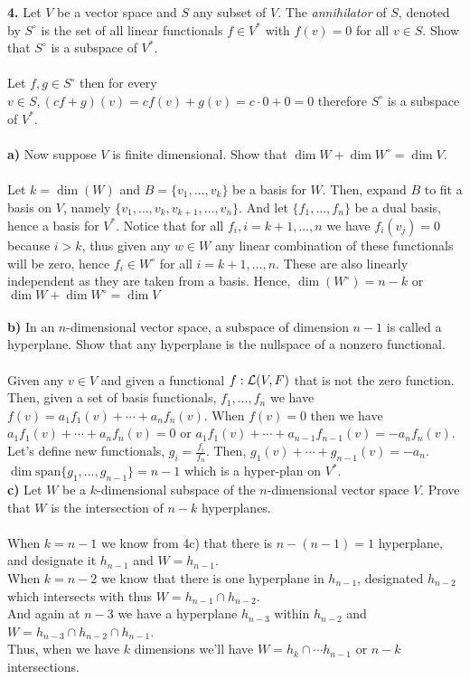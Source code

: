 \documentclass[11pt]{amsart}
\theoremstyle{definition}  %
\begin{document}
\newpage
\vskip 0.1cm
\noindent
{\bf 4.} Let $V$ be a vector space and $S$ any subset of $V$. The {\it annihilator} of $S$, denoted by $S^\circ$ is the 
set of all linear functionals $f \in V^*$ with $f(v) = 0 $ for all $v \in S$. Show that $S^\circ$ is a subspace of $V^*$. \\ 
\\
Let $f,g \in S^\circ$ then for every $v \in S, (cf+g)(v) = cf(v)+g(v)=c\cdot 0+0=0$ therefore $S^\circ$ is a subspace of $V^*$.\\
\\
{\bf a)} Now suppose $V$ is finite dimensional. Show that $\dim W + \dim W^\circ = \dim V$. \\
\\
Let $k=\dim(W)$ and $B=\{v_1,\dots,v_k\}$ be a basis for $W$.  Then, expand $B$ to fit a basis on $V$, namely $\{v_1,\dots,v_k,v_{k+1},\dots,v_n\}$.  And let $\{f_1, \dots, f_n\}$ be a dual basis, hence a basis for $V^*$.  Notice that for all $f_i, i=k+1,\dots,n$ we have $f_i(v_j)=0$ because $i>k$, thus given any $w\in W$ any linear combination of these functionals will be zero, hence $f_i\in W^\circ$ for all $i=k+1,\dots,n$.  These are also linearly independent as they are taken from a basis.  Hence, $\dim(W^\circ) = n-k$ or $\dim W+\dim W^\circ=\dim V$\\
\\
{\bf b)} In an $n$-dimensional vector space, a subspace of dimension $n-1$ is called a hyperplane. Show that any hyperplane
is the nullspace of a nonzero functional. \\
\\
Given any $v \in V$ and given a functional $f:\mathcal{L}(V,F)$ that is not the zero function.  Then, given a set of basis functionals, $f_1,\dots,f_n$ we have $f(v)=a_1f_1(v)+\cdots+a_nf_n(v)$.  When $f(v)=0$ then we have $a_1f_1(v)+\cdots+a_nf_n(v)=0$ or $a_1f_1(v)+\cdots+a_{n-1}f_{n-1}(v)=-a_nf_n(v)$.  Let's define new functionals, $g_i=\frac{f_i}{f_n}$.  Then, $g_1(v)+\cdots+g_{n-1}(v)=-a_n$.  $\dim\mathrm{span}\{g_1,\dots,g_{n-1}\} = n-1$ which is a hyper-plan on $V^*$.
\\

{\bf c)} Let $W$ be a $k$-dimensional subspace of the $n$-dimensional vector space $V$. Prove that $W$ is the 
intersection of $n-k$ hyperplanes. \\
\\
When $k=n-1$ we know from 4c) that there is $n-(n-1)=1$ hyperplane, and designate it $h_{n-1}$ and $W=h_{n-1}$.  \\
When $k=n-2$ we know that there is one hyperplane in $h_{n-1}$, designated $h_{n-2}$ which intersects with thus $W=h_{n-1}\cap h_{n-2}$.\\
And again at $n-3$ we have a hyperplane $h_{n-3}$ within $h_{n-2}$ and $W=h_{n-3}\cap h_{n-2}\cap h_{n-1}$.\\  Thus, when we have $k$ dimensions we'll have $W= h_k\cap\cdots h_{n-1} $ or $n-k$ intersections. \\
\end{document}

